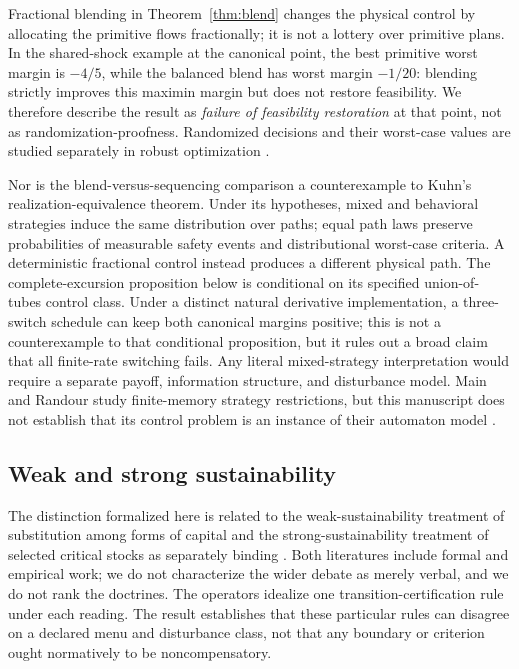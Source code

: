 \documentclass[preprint,11pt,authoryear]{elsarticle}
\theoremstyle{definition}
\theoremstyle{remark}
\begin{document}
Fractional blending in Theorem~\ref{thm:blend} changes the physical control by allocating the primitive flows fractionally; it is not a lottery over primitive plans. In the shared-shock example at the canonical point, the best primitive worst margin is $-4/5$, while the balanced blend has worst margin $-1/20$: blending strictly improves this maximin margin but does not restore feasibility. We therefore describe the result as \emph{failure of feasibility restoration} at that point, not as randomization-proofness. Randomized decisions and their worst-case values are studied separately in robust optimization \citep{Delage2019,KrauseRoperGolovin2011,VorobeychikLi2014,Sinha2018,Sessa2020}.

Nor is the blend-versus-sequencing comparison a counterexample to Kuhn's realization-equivalence theorem. Under its hypotheses, mixed and behavioral strategies induce the same distribution over paths; equal path laws preserve probabilities of measurable safety events and distributional worst-case criteria. A deterministic fractional control instead produces a different physical path. The complete-excursion proposition below is conditional on its specified union-of-tubes control class. Under a distinct natural derivative implementation, a three-switch schedule can keep both canonical margins positive; this is not a counterexample to that conditional proposition, but it rules out a broad claim that all finite-rate switching fails. Any literal mixed-strategy interpretation would require a separate payoff, information structure, and disturbance model. Main and Randour study finite-memory strategy restrictions, but this manuscript does not establish that its control problem is an instance of their automaton model \citep{Kuhn1953,MainRandour2024}.

\subsection{Weak and strong sustainability}

The distinction formalized here is related to the weak-sustainability treatment of substitution among forms of capital and the strong-sustainability treatment of selected critical stocks as separately binding \citep{PearceAtkinson1993,Beckerman1994,Daly1995,Ayres2001,Neumayer2013,DietzNeumayer2007}. Both literatures include formal and empirical work; we do not characterize the wider debate as merely verbal, and we do not rank the doctrines. The operators idealize one transition-certification rule under each reading. The result establishes that these particular rules can disagree on a declared menu and disturbance class, not that any boundary or criterion ought normatively to be noncompensatory.
\end{document}
